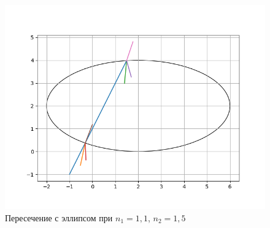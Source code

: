 {	\begin{figure}[H]
		\includegraphics[width=0.7\pagewidth]{ell_intersect2}
		\caption{Пересечение с эллипсом при $n_1 = 1,1$, $n_2 = 1,5$}
		\label{ell_intersect2}
	\end{figure}
	
%	
%	
%	
%	
%	
}

\newpage

\titleformat{\section}{\large\bfseries\centering}{\thesection}{0.5em}{\MakeUppercase}
\titleformat{\subsection}[block]{\bfseries\hspace{1em}}{\thesubsection}{0.5em}{}

